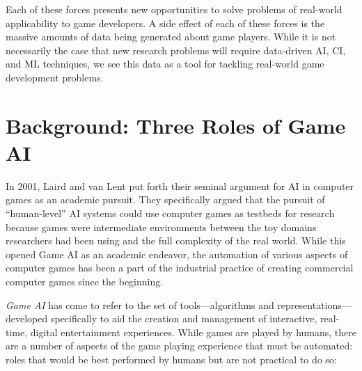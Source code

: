 \documentclass[conference]{IEEEtran}
\begin{document}


Each of these forces presents new opportunities to solve problems of real-world applicability to game developers.
A side effect of each of these forces is the massive amounts of data being generated about game players.
While it is not necessarily the case that new research problems will require data-driven AI, CI, and ML techniques, we see this data as a tool for tackling real-world game development problems.



\section{Background: Three Roles of Game AI}

In 2001, Laird and van Lent \cite{laird2001:gameai} put forth their seminal argument for AI in computer games as an academic pursuit. 
They specifically argued that the pursuit of ``human-level'' AI systems could use computer games as testbeds for research because games were intermediate environments between the toy domains researchers had been using and the full complexity of the real world.
While this opened Game AI as an academic endeavor, the automation of various aspects of computer games has been a part of the industrial practice of creating commercial computer games since the beginning. 

{\em Game AI} has come to refer to the set of tools---algorithms and representations---developed specifically to aid the creation and management of interactive, real-time, digital entertainment experiences.
While games are played by humans, there are a number of aspects of the game playing experience that must be automated: roles that would be best performed by humans but are not practical to do so:
\end{document}

